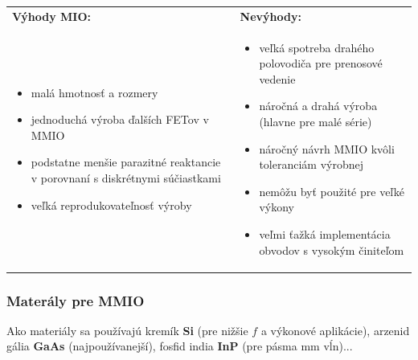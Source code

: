 	
	\begin{tabular}{p{8cm} p{8cm}}
	\textbf{Výhody MIO:} & \textbf{Nevýhody:} \\
	
	\begin{minipage}[t]{8cm}
		\begin{itemize}[label=$\oplus$]
			\item malá hmotnosť a rozmery
			\item jednoduchá výroba ďalších FETov v MMIO
			\item podstatne menšie parazitné reaktancie v porovnaní s diskrétnymi súčiastkami
			\item veľká reprodukovateľnosť výroby
		\end{itemize}
	\end{minipage}
	&
	\begin{minipage}[t]{8cm}
		\begin{itemize}[label=$\ominus$]
			\item veľká spotreba drahého polovodiča pre prenosové vedenie
			\item náročná a drahá výroba (hlavne pre malé  série)
			\item náročný návrh MMIO kvôli toleranciám výrobnej 
			\item nemôžu byť použité pre veľké výkony
			\item veľmi ťažká implementácia obvodov s vysokým činiteľom
		\end{itemize}
	\end{minipage}
	\end{tabular}
	
	\subsubsection{Materály pre MMIO}
	Ako materiály sa používajú kremík \textbf{Si} (pre nižšie $f$ a výkonové aplikácie), arzenid gália \textbf{GaAs} (najpoužívanejší), fosfid india \textbf{InP} (pre pásma mm vĺn)...
	

